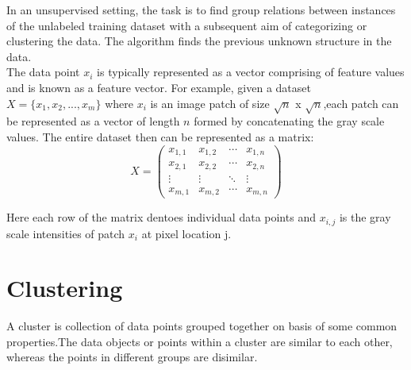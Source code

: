 In an unsupervised setting, the task is to find group relations between instances of the unlabeled training dataset with a subsequent aim of categorizing or clustering the data. The algorithm finds the previous unknown structure in the data.\\

The data point $x_i$ is typically represented as a vector comprising of feature values and is known as a feature vector. For example, given a dataset $X =\{x_1,x_2,...,x_m\}$ where $x_i$ is an image patch of size $\sqrt{n}$ x $\sqrt{n}$,each patch can be represented as a vector of length $n$ formed by concatenating the gray scale values. The entire dataset then can be represented as a matrix:
\begin{equation*}
X = \begin{pmatrix}
x_{1,1} & x_{1,2} & \cdots & x_{1,n} \\
x_{2,1} & x_{2,2} & \cdots & x_{2,n} \\
\vdots  & \vdots  & \ddots & \vdots  \\
x_{m,1} & x_{m,2} & \cdots & x_{m,n}
\end{pmatrix}
\end{equation*}

Here each row of the matrix dentoes individual data points and ${x_{i,j}}$ is the gray scale intensities of patch $x_i$ at pixel location j.
%
%
%
%
%

\section{Clustering}
A cluster is collection of data points grouped together on basis of some common properties.The data objects or points within a cluster are similar to each other, whereas the points in different groups are disimilar.\\

